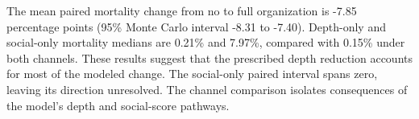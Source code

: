 The mean paired mortality change from no to full organization is -7.85 percentage points (95\% Monte Carlo interval -8.31 to -7.40). Depth-only and social-only mortality medians are 0.21\% and 7.97\%, compared with 0.15\% under both channels. These results suggest that the prescribed depth reduction accounts for most of the modeled change. The social-only paired interval spans zero, leaving its direction unresolved. The channel comparison isolates consequences of the model's depth and social-score pathways.
